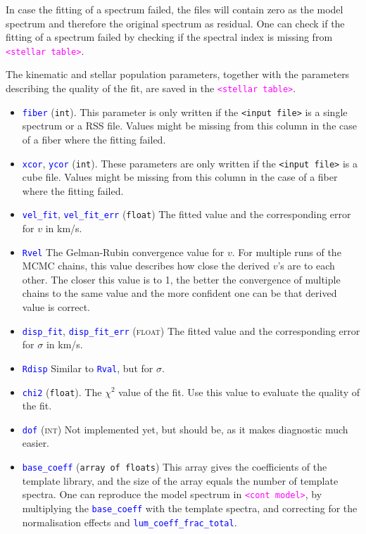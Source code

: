 \documentclass[usenatbib,usegraphicx,useAMS,onecolumn]{mn2e}
\newcommand{\codeline}[1]{\lstinline|#1|}
\newcommand{\tblcol}[1]{\textcolor{blue}{\codeline{#1}}}
\newcommand{\fname}[1]{\textcolor{magenta}{\codeline{#1}}}
\begin{document}
In case the fitting of a spectrum failed, the files will contain zero as the model spectrum and therefore the original spectrum as residual.
One can check if the fitting of a spectrum failed by checking if the spectral index is missing from \fname{<stellar table>}.

The kinematic and stellar population parameters, together with the parameters describing the quality of the fit, are saved in the \fname{<stellar table>}.
\begin{itemize}
    \item \tblcol{fiber} (\texttt{int}).
        This parameter is only written if the \texttt{<input file>} is a single spectrum or a RSS file.
        Values might be missing from this column in the case of a fiber where the fitting failed.
    \item \tblcol{xcor}, \tblcol{ycor} (\texttt{int}).
        These parameters are only written if the \texttt{<input file>} is a cube file.
        Values might be missing from this column in the case of a fiber where the fitting failed.
    \item \tblcol{vel_fit}, \tblcol{vel_fit_err} (\texttt{float})
        The fitted value and the corresponding error for $v$ in km/s.
    \item \tblcol{Rvel}
        The Gelman-Rubin convergence value for $v$.
        For multiple runs of the MCMC chains, this value describes how close the derived $v$'s are to each other.
        The closer this value is to 1, the better the convergence of multiple chains to the same value and the more confident one can be that derived value is correct.
    \item \tblcol{disp_fit}, \tblcol{disp_fit_err} (\textsc{float})
        The fitted value and the corresponding error for $\sigma$ in km/s.
    \item \tblcol{Rdisp}
        Similar to \tblcol{Rval}, but for $\sigma$.
    \item \tblcol{chi2} (\texttt{float}).
        The $\chi^2$ value of the fit.
        Use this value to evaluate the quality of the fit.
    \item \tblcol{dof} (\textsc{int})
        Not implemented yet, but should be, as it makes diagnostic much easier.
    \item \tblcol{base_coeff} (\texttt{array of floats})
        This array gives the coefficients of the template library, and the size of the array equals the number of template spectra.
        One can reproduce the model spectrum in \fname{<cont model>}, by multiplying the \tblcol{base_coeff} with the template spectra, and correcting for the normalisation effects and \tblcol{lum_coeff_frac_total}.

\end{itemize}
\end{document}
